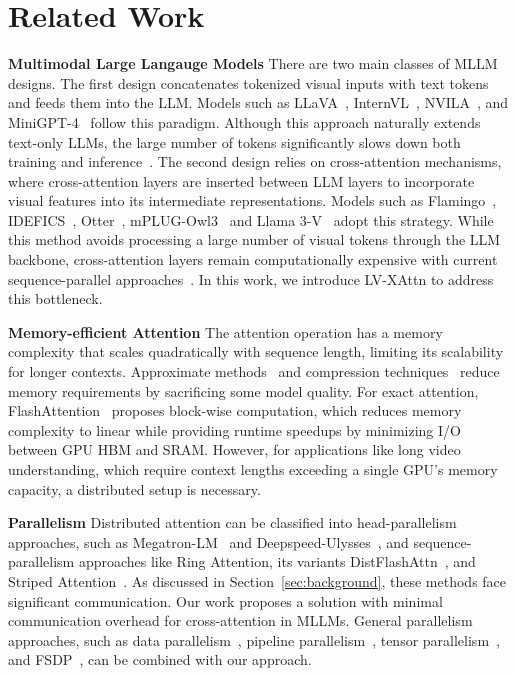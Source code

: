 \section{Related Work}
\textbf{Multimodal Large Langauge Models} There are two main classes of MLLM designs. The first design concatenates tokenized visual inputs with text tokens and feeds them into the LLM. Models such as LLaVA~\cite{liu2023llava}, InternVL~\cite{chen2024internvl}, NVILA~\cite{liu2024nvila}, and MiniGPT-4~\cite{zhu2024minigpt} follow this paradigm. Although this approach naturally extends text-only LLMs, the large number of tokens significantly slows down both training and inference~\cite{ye2024mplugowl3, grattafiori2024llama3v}. The second design relies on cross-attention mechanisms, where cross-attention layers are inserted between LLM layers to incorporate visual features into its intermediate representations. Models such as Flamingo~\cite{alayrac2022flamingo}, IDEFICS~\cite{laurencon2023idefics}, Otter~\cite{li2023otter}, mPLUG-Owl3~\cite{ye2024mplugowl3} and Llama 3-V~\cite{grattafiori2024llama3v} adopt this strategy. While this method avoids processing a large number of visual tokens through the LLM backbone, cross-attention layers remain computationally expensive with current sequence-parallel approaches~\cite{grattafiori2024llama3v}. In this work, we introduce LV-XAttn to address this bottleneck.

\textbf{Memory-efficient Attention} The attention operation has a memory complexity that scales quadratically with sequence length, limiting its scalability for longer contexts. Approximate methods~\cite{kitaev2020reformer, zaheer2020bigbird, beltagy2020longformer, choromanski2021performer, ding2023longnet} and compression techniques~\cite{chevalier2023autocompressors, munkhdalai2024infini-attention} reduce memory requirements by sacrificing some model quality. For exact attention, FlashAttention~\cite{dao2022fa, dao2023fa2} proposes block-wise computation, which reduces memory complexity to linear while providing runtime speedups by minimizing I/O between GPU HBM and SRAM. However, for applications like long video understanding, which require context lengths exceeding a single GPU's memory capacity, a distributed setup is necessary.

\textbf{Parallelism} Distributed attention can be classified into head-parallelism approaches, such as Megatron-LM~\cite{korthikanti2023megatron-lm} and Deepspeed-Ulysses~\cite{jacobs2024ds}, and sequence-parallelism approaches like Ring Attention, its variants DistFlashAttn~\cite{li2024distflashattn}, and Striped Attention~\cite{brandon2023striped}. As discussed in Section~\ref{sec:background}, these methods face significant communication. Our work proposes a solution with minimal communication overhead for cross-attention in MLLMs. General parallelism approaches, such as data parallelism~\cite{dean2012data-parallel}, pipeline parallelism~\cite{narayanan2019pipedream}, tensor parallelism~\cite{shoeybi2019megatron}, and FSDP~\cite{rajbhandari2020zero}, can be combined with our approach.
